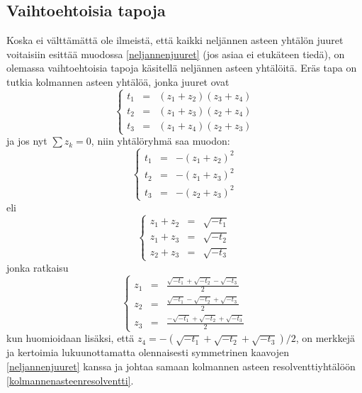 \documentclass[a4paper]{article}
\begin{document}
\subsection{Vaihtoehtoisia tapoja}
Koska ei välttämättä ole ilmeistä, että kaikki neljännen asteen yhtälön juuret voitaisiin esittää muodossa \ref{neljannenjuuret} (jos asiaa ei etukäteen tiedä), on olemassa vaihtoehtoisia tapoja käsitellä neljännen asteen yhtälöitä. Eräs tapa on tutkia kolmannen asteen yhtälöä, jonka juuret ovat
$$
\left\{
\begin{array}{ccc}
  t_1 & = & (z_1+z_2)(z_3+z_4) \\
  t_2 & = & (z_1+z_3)(z_2+z_4) \\
  t_3 & = & (z_1+z_4)(z_2+z_3)
\end{array}
\right.
$$
ja jos nyt $\sum z_k=0$, niin yhtälöryhmä saa muodon:
$$
\left\{
\begin{array}{ccc}
  t_1 & = & -(z_1+z_2)^2 \\
  t_2 & = & -(z_1+z_3)^2 \\
  t_3 & = & -(z_2+z_3)^2
\end{array}
\right.
$$
eli
$$
\left\{
\begin{array}{ccc}
  z_1+z_2 & = & \sqrt{-t_1} \\
  z_1+z_3 & = & \sqrt{-t_2} \\
  z_2+z_3 & = & \sqrt{-t_3}
\end{array}
\right.
$$
jonka ratkaisu
$$
\left\{
\begin{array}{ccc}
  z_1 & = & \frac{\sqrt{-t_1}+\sqrt{-t_2}-\sqrt{-t_3}}{2} \\
  z_2 & = & \frac{\sqrt{-t_1}-\sqrt{-t_2}+\sqrt{-t_3}}{2} \\
  z_3 & = & \frac{-\sqrt{-t_1}+\sqrt{-t_2}+\sqrt{-t_3}}{2}
\end{array}
\right.
$$
kun huomioidaan lisäksi, että $z_4=-(\sqrt{-t_1}+\sqrt{-t_2}+\sqrt{-t_3})/2$, on merkkejä ja kertoimia lukuunottamatta olennaisesti symmetrinen kaavojen \ref{neljannenjuuret} kanssa ja johtaa samaan kolmannen asteen resolventtiyhtälöön \ref{kolmannenasteenresolventti}.
\end{document}
